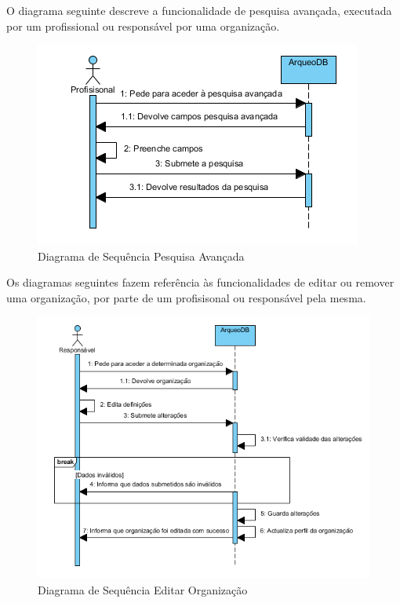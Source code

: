 \documentclass[12pt,a4paper]{article}
\begin{document}
\clearpage
\clearpage
O diagrama seguinte descreve a funcionalidade de pesquisa avançada, executada por um profissional ou responsável por uma organização.\\

\begin{figure}[h!]
\centering
\includegraphics[scale=1]{sequencia/pesquisaavancada}
\caption{Diagrama de Sequência Pesquisa Avançada} 
\end{figure} 

Os diagramas seguintes fazem referência às funcionalidades de editar ou remover uma organização, por parte de um profisisonal ou responsável pela mesma.\\

\begin{figure}[h!]
\centering
\includegraphics[scale=1]{sequencia/editarorganizacao}
\caption{Diagrama de Sequência Editar Organização} 
\end{figure}  
\end{document}
